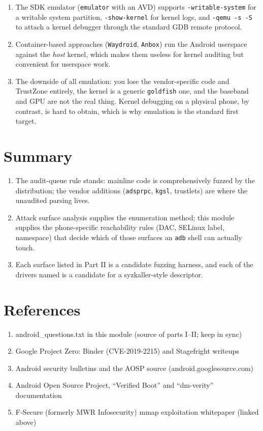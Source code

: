 \documentclass[12pt]{Training}
\begin{document}
\begin{enumerate}
\begin{enumerate}
        \item The SDK emulator (\lstinline{emulator} with an AVD) supports \lstinline{-writable-system} for a writable system partition, \lstinline{-show-kernel} for kernel logs, and \lstinline{-qemu -s -S} to attach a kernel debugger through the standard GDB remote protocol.
        \item Container-based approaches (\lstinline{Waydroid}, \lstinline{Anbox}) run the Android userspace against the \emph{host} kernel, which makes them useless for kernel auditing but convenient for userspace work.
        \item The downside of all emulation: you lose the vendor-specific code and TrustZone entirely, the kernel is a generic \lstinline{goldfish} one, and the baseband and GPU are not the real thing. Kernel debugging on a physical phone, by contrast, is hard to obtain, which is why emulation is the standard first target.
    \end{enumerate}
\end{enumerate}


\section*{Summary}
\begin{enumerate}
    \item The audit-queue rule stands: mainline code is comprehensively fuzzed by the distribution; the vendor additions (\lstinline{adsprpc}, \lstinline{kgsl}, trustlets) are where the unaudited parsing lives.
    \item Attack surface analysis supplies the enumeration method; this module supplies the phone-specific reachability rules (DAC, SELinux label, namespace) that decide which of those surfaces an \lstinline{adb} shell can actually touch.
    \item Each surface listed in Part II is a candidate fuzzing harness, and each of the drivers named is a candidate for a syzkaller-style descriptor.
\end{enumerate}

\section*{References}
\begin{enumerate}
	\item android\_questions.txt in this module (source of parts I--II; keep in sync)
	\item Google Project Zero: Binder (CVE-2019-2215) and Stagefright writeups
	\item Android security bulletins and the AOSP source (android.googlesource.com)
	\item Android Open Source Project, ``Verified Boot'' and ``dm-verity'' documentation
	\item F-Secure (formerly MWR Infosecurity) mmap exploitation whitepaper (linked above)
\end{enumerate}
\end{document}

